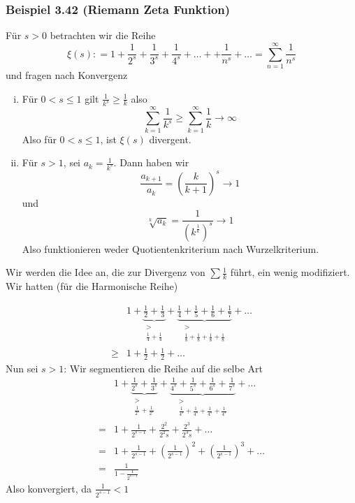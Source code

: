\subsubsection*{Beispiel 3.42 (Riemann Zeta Funktion)}
Für $s>0$ betrachten wir die Reihe 
\[\xi (s): = 1 + \frac{1}{{{2^s}}} + \frac{1}{{{3^s}}} + \frac{1}{{{4^s}}} +  \ldots  +  + \frac{1}{{{n^s}}} +  \ldots  = \sum\limits_{n = 1}^\infty  {\frac{1}{{{n^s}}}} \]
und fragen nach Konvergenz
\begin{enumerate}[(i)]
\item Für $0<s\leq 1$ gilt $\frac{1}{{{k^s}}} \ge \frac{1}{k}$ also 
\[\sum\limits_{k = 1}^\infty  {\frac{1}{{{k^s}}}}  \ge \sum\limits_{k = 1}^\infty  {\frac{1}{k}}  \to \infty \]
Also für $0<s\leq 1$, ist $\xi(s)$ divergent.
\item Für $s>1$, sei $a_k=\frac{1}{k^s}$. Dann haben wir 
\[\frac{{{a_{k + 1}}}}{{{a_k}}} = {\left( {\frac{k}{{k + 1}}} \right)^s} \to 1\]
und \[\sqrt[k]{{{a_k}}} = \frac{1}{{{{\left( {{k^{\frac{1}{k}}}} \right)}^s}}} \to 1\]
Also funktionieren weder Quotientenkriterium nach Wurzelkriterium. 
\end{enumerate}
Wir werden die Idee an, die zur  Divergenz von $\sum\frac{1}{k}$ führt, ein wenig modifiziert. Wir hatten (für die Harmonische Reihe)

\begin{align*}
&1 + \underbrace {\frac{1}{2} + \frac{1}{3}}_{\begin{array}{*{20}{c}}
 > \\
{\frac{1}{4} + \frac{1}{4}}
\end{array}} + \underbrace {\frac{1}{4} + \frac{1}{5} + \frac{1}{6} + \frac{1}{7}}_{\begin{array}{*{20}{c}}
 > \\
{\frac{1}{8} + \frac{1}{8} + \frac{1}{8} + \frac{1}{8}}
\end{array}} +  \ldots \\
 \ge&1 + \frac{1}{2} + \frac{1}{2} +  \ldots 
\end{align*}
Nun sei $s>1$: Wir segmentieren die Reihe auf die selbe Art
\begin{align*}
&1 + \underbrace {\frac{1}{{{2^s}}} + \frac{1}{{{3^s}}}}_{\begin{array}{*{20}{c}}
 > \\
{\frac{1}{{{2^s}}} + \frac{1}{{{2^s}}}}
\end{array}} + \underbrace {\frac{1}{{{4^s}}} + \frac{1}{{{5^s}}} + \frac{1}{{{6^s}}} + \frac{1}{{{7^s}}}}_{\begin{array}{*{20}{c}}
 > \\
{\frac{1}{{{4^s}}} + \frac{1}{{{4^s}}} + \frac{1}{{{4^s}}} + \frac{1}{{{4^s}}}}
\end{array}} +  \ldots \\
=&1 + \frac{1}{{{2^{s - 1}}}} + \frac{{{2^2}}}{{{2^2}s}} + \frac{{{2^3}}}{{{2^3}s}} +  \ldots \\
=&1 + \frac{1}{{{2^{s - 1}}}} + {\left( {\frac{1}{{{2^{s - 1}}}}} \right)^2} + {\left( {\frac{1}{{{2^{s - 1}}}}} \right)^3} +  \ldots \\
=&\frac{1}{{1 - \frac{1}{{{2^{s - 1}}}}}}
\end{align*}
Also konvergiert, da $\frac{1}{{{2^{s - 1}}}} < 1$

